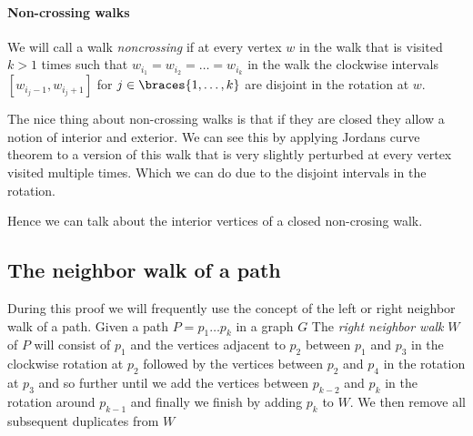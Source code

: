   \paragraph{Non-crossing walks}
  We will call a walk \emph{noncrossing} if at every vertex $w$ in the walk that is visited $k >1$ times such that $w_{i_1} = w_{i_2} = \ldots = w_{i_k}$ in the walk the clockwise intervals $[w_{i_j-1}, w_{i_j+1}]$ for $j \in \braces {1, \ldots, k}$ are disjoint in the rotation at $w$.

  The nice thing about non-crossing walks is that if they are closed they allow a notion of interior and exterior. We can see this by applying Jordans curve theorem to a version of this walk that is very slightly perturbed at every vertex visited multiple times. Which we can do due to the disjoint intervals in the rotation.

  Hence we can talk about the interior vertices of a closed non-crosing walk.




\subsection{The neighbor walk of a path}
  During this proof we will frequently use the concept of the left or right neighbor walk of a path.
  Given a path $P = p_1 \ldots p_k$ in a graph $G$
  The \emph{right neighbor walk} $W$ of $P$ will consist of $p_1$ and the vertices adjacent to $p_{2}$ between $p_1$ and $p_{3}$ in the clockwise rotation at $p_{2}$ followed by the vertices between $p_{2}$ and $p_{4}$ in the rotation at $p_{3}$ and so further until we add the vertices between $p_{k-2}$ and $p_k$ in the rotation around $p_{k-1}$ and finally we finish by adding $p_k$ to $W$.
  We then remove all subsequent duplicates from $W$

